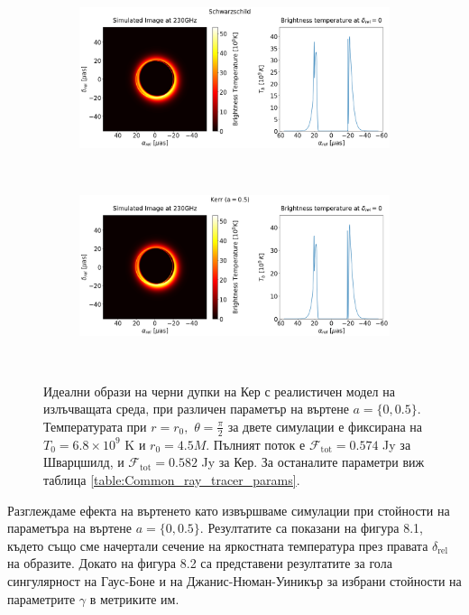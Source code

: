 \begin{figure}[h!]
	\centering
	\begin{subfigure}{12cm}
		\hspace{-1cm}
		\includegraphics[scale = 0.3]{Ray_tracer_plot_230_Sch.png}
	\end{subfigure}\\
	\begin{subfigure}{12cm}
		\hspace{-1cm}
		\includegraphics[scale = 0.3]{Ray_tracer_plot_230_Kerr_0.5.png}
	\end{subfigure}\\
	\label{Kerr_Ray_tracer_230}
	\caption[Идеални образи на черни дупки на Кер с реалистичен модел на излъчващата среда, при различен параметър на въртене $a$]{Идеални образи на черни дупки на Кер с реалистичен модел на излъчващата среда, при различен параметър на въртене $a = \{0, 0.5\}$. Температурата при $r = r_0,\,\,\theta = \frac{\pi}{2}$ за двете симулации е фиксирана на $T_0 = 6.8\times10^9$ K и $r_0 = 4.5M$. Пълният поток е $\mathcal{F}_{\text{tot}} = 0.574$ Jy за Шварцшилд, и $\mathcal{F}_{\text{tot}} = 0.582$ Jy за Кер. За останалите параметри виж таблица \ref{table:Common_ray_tracer_params}.} 
\end{figure}

Разглеждаме ефекта на въртенето като извършваме симулации при стойности на параметъра на въртене $a = \{0, 0.5\}$. Резултатите са показани на фигура 8.1, където също сме начертали сечение на яркостната температура през правата $\delta_{\text{rel}}$ на образите. Докато на фигура 8.2 са представени резултатите за гола сингулярност на Гаус-Боне и на Джанис-Нюман-Уиникър за избрани стойности на параметрите $\gamma$ в метриките им.\\

